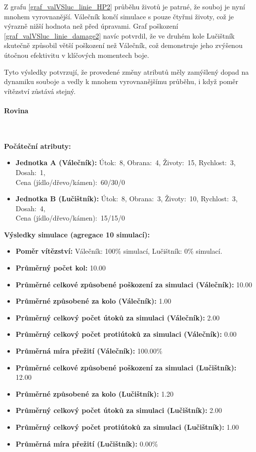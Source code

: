 Z grafu \ref{graf_valVSluc_linie_HP2} průběhu životů je patrné, že souboj je nyní mnohem vyrovnanější. Válečník končí simulace s pouze čtyřmi životy, což je výrazně nižší hodnota než před úpravami. Graf poškození \ref{graf_valVSluc_linie_damage2} navíc potvrdil, že ve druhém kole Lučištník skutečně způsobil větší poškození než Válečník, což demonstruje jeho zvýšenou útočnou efektivitu v klíčových momentech boje.

Tyto výsledky potvrzují, že provedené změny atributů měly zamýšlený dopad na dynamiku souboje a vedly k mnohem vyrovnanějšímu průběhu, i když poměr vítězství zůstává stejný.

\paragraph{Rovina}~ \newline

\textbf{Počáteční atributy:}
\begin{itemize}
\item \textbf{Jednotka A (Válečník):} Útok:~8, Obrana:~4, Životy:~15, Rychlost:~3, Dosah:~1, \\ Cena (jídlo/dřevo/kámen):~60/30/0
\item \textbf{Jednotka B (Lučištník):} Útok:~8, Obrana:~3, Životy:~10, Rychlost:~3, Dosah:~4, \\ Cena (jídlo/dřevo/kámen):~15/15/0
\end{itemize}

\textbf{Výsledky simulace (agregace 10 simulací):}
\begin{itemize}
\item \textbf{Poměr vítězství:} Válečník: 100\% simulací, Lučištník: 0\% simulací.
\item \textbf{Průměrný počet kol:} 10.00
\item \textbf{Průměrné celkové způsobené poškození za simulaci (Válečník):} 10.00
\item \textbf{Průměrné způsobené za kolo (Válečník):} 1.00
\item \textbf{Průměrný celkový počet útoků za simulaci (Válečník):} 2.00
\item \textbf{Průměrný celkový počet protiútoků za simulaci (Válečník):} 0.00
\item \textbf{Průměrná míra přežití (Válečník):} 100.00\%
\item \textbf{Průměrné celkové způsobené poškození za simulaci (Lučištník):} 12.00
\item \textbf{Průměrné způsobené za kolo (Lučištník):} 1.20
\item \textbf{Průměrný celkový počet útoků za simulaci (Lučištník):} 2.00
\item \textbf{Průměrný celkový počet protiútoků za simulaci (Lučištník):} 1.00
\item \textbf{Průměrná míra přežití (Lučištník):} 0.00\%
\end{itemize}

